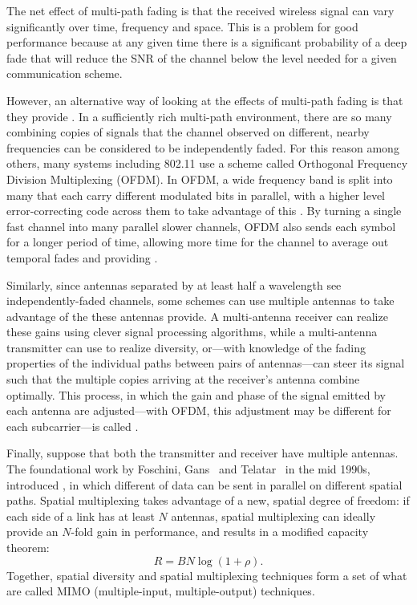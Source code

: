 The net effect of multi-path fading is that the received wireless signal can vary significantly over time, frequency and space. This is a problem for good performance because at any given time there is a significant probability of a deep fade that will reduce the SNR of the channel below the level needed for a given communication scheme.

However, an alternative way of looking at the effects of multi-path fading is that they provide . In a sufficiently rich multi-path environment, there are so many combining copies of signals that the channel observed on different, nearby frequencies can be considered to be independently faded. For this reason among others, many systems including 802.11 use a scheme called Orthogonal Frequency Division Multiplexing (OFDM). In OFDM, a wide frequency band is split into many  that each carry different modulated bits in parallel, with a higher level error-correcting code across them to take advantage of this . By turning a single fast channel into many parallel slower channels, OFDM also sends each symbol for a longer period of time, allowing more time for the channel to average out temporal fades and providing . 

Similarly, since antennas separated by at least half a wavelength see independently-faded channels, some schemes can use multiple antennas to take advantage of the  these antennas provide. A multi-antenna receiver can realize these gains using clever signal processing algorithms, while a multi-antenna transmitter can use  to realize diversity, or---with knowledge of the fading properties of the individual paths between pairs of antennas---can steer its signal such that the multiple copies arriving at the receiver's antenna combine optimally. This process, in which the gain and phase of the signal emitted by each antenna are adjusted---with OFDM, this adjustment may be different for each subcarrier---is called .

Finally, suppose that both the transmitter and receiver have multiple antennas. The foundational work by Foschini, Gans~\cite{Foschini_Gans} and Telatar~\cite{Telatar_MIMO} in the mid 1990s, introduced , in which different  of data can be sent in parallel on different spatial paths. Spatial multiplexing takes advantage of a new, spatial degree of freedom: if each side of a link has at least $N$ antennas, spatial multiplexing can ideally provide an $N$-fold gain in performance, and results in a modified capacity theorem:
\begin{equation}
\label{eq:mimo_capacity}
R = BN\log(1+\rho).
\end{equation}
Together, spatial diversity and spatial multiplexing techniques form a set of what are called MIMO (multiple-input, multiple-output) techniques.


